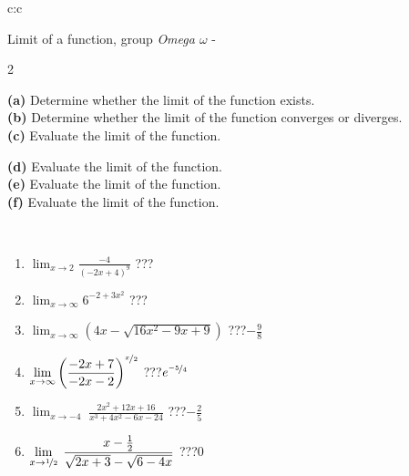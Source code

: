 \documentclass[10pt]{report}
\begin{document}
\newpage
\thispagestyle{empty}
\begin{tabular}{c:c}
\begin{minipage}[c][104.5mm][t]{0.5\linewidth}
\begin{center}
\vspace{5mm}
{\huge Limit of a function, group \textit{Omega $\omega$} -}\\[5mm]
\begin{minipage}{0.95\linewidth}
\begin{center}
{\small \begin{multicols}{2} \raggedright
\textbf{(a)} Determine whether the limit of the function exists. \\[1mm]
\textbf{(b)} Determine whether the limit of the function converges or diverges. \\[1mm]
\textbf{(c)} Evaluate the limit of the function. \par \columnbreak
\textbf{(d)} Evaluate the limit of the function. \\[1mm]
\textbf{(e)} Evaluate the limit of the function. \\[1mm]
\textbf{(f)} Evaluate the limit of the function. \\[1mm]
\end{multicols}
}
\end{center}
\end{minipage}
\\[1mm]
\begin{minipage}{0.79\linewidth}
\begin{center}
\begin{varwidth}{\linewidth}
\setlength{\itemsep}{0pt}
\begin{enumerate}
\normalsize
\item $\displaystyle\lim_{x\to2}{\frac{-4}{(-2x+4)^{9}}}$\quad \dotfill\; ???\;\dotfill \quad {}
\item $\displaystyle\lim_{x\to\infty}{6^{-2+3x^2}}$\quad \dotfill\; ???\;\dotfill \quad {}
\item $\displaystyle\lim_{x\to\infty}{\left(4x - \sqrt{16x^2-9x+9}\right)}$\quad \dotfill\; ???\;\dotfill \quad $-\frac{9}{8}$
\item $\displaystyle\lim_{x\to\infty}{\left( \frac{-2x+7}{-2x-2} \right)^{\nicefrac{x}{2}}}$\quad \dotfill\; ???\;\dotfill \quad $e^{\nicefrac{-5}{4}}$
\item $\displaystyle\lim_{x\to -4}{\;\frac{2x^2+12x+16}{x^3+4x^2-6x-24}}$\quad \dotfill\; ???\;\dotfill \quad $-\frac{2}{5}$
\item $\displaystyle\lim_{x\to \nicefrac{1}{2}}{\;\frac{x-\frac{1}{2}}{\sqrt{2x+3} - \sqrt{6-4x}}}$\quad \dotfill\; ???\;\dotfill \quad $0$

\end{enumerate}
\end{varwidth}
\end{center}
\end{minipage}
\end{center}
\end{minipage}
\end{tabular}
\end{document}
